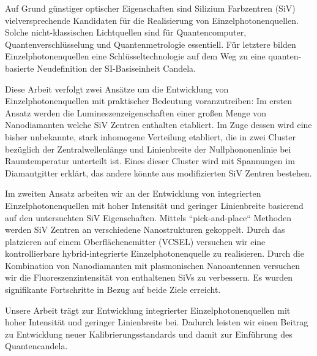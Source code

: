 	Auf Grund günstiger optischer Eigenschaften sind Silizium Farbzentren (SiV) vielversprechende Kandidaten für die Realisierung von Einzelphotonenquellen. Solche nicht-klassischen Lichtquellen sind für Quantencomputer, Quantenverschlüsselung und Quantenmetrologie essentiell. Für letztere bilden Einzelphotonenquellen eine Schlüsseltechnologie auf dem Weg zu eine quanten-basierte Neudefinition der SI-Basiseinheit Candela.

	Diese Arbeit verfolgt zwei Ansätze um die Entwicklung von Einzelphotonenquellen mit praktischer Bedeutung voranzutreiben: 
	Im ersten Ansatz werden die Lumineszenzeigenschaften einer großen Menge von Nanodiamanten welche SiV Zentren enthalten etabliert. 
	Im Zuge dessen wird eine bisher unbekannte, stark inhomogene Verteilung etabliert, die in zwei Cluster bezüglich der Zentralwellenlänge und Linienbreite der Nullphononenlinie bei Raumtemperatur unterteilt ist.
	Eines dieser Cluster wird mit Spannungen im Diamantgitter erklärt, das andere könnte aus modifizierten SiV Zentren bestehen.

	Im zweiten Ansatz arbeiten wir an der Entwicklung von integrierten Einzelphotonenquellen mit hoher Intensität und geringer Linienbreite basierend auf den untersuchten SiV Eigenschaften. Mittels “pick-and-place“ Methoden werden SiV Zentren an verschiedene Nanostrukturen gekoppelt. 
	Durch das platzieren auf einem Oberflächenemitter (VCSEL) versuchen wir eine kontrollierbare hybrid-integrierte Einzelphotonenquelle zu realisieren. 
	Durch die Kombination von Nanodiamanten mit plasmonischen Nanoantennen versuchen wir die Fluoreszenzintensität von enthaltenen SiVs zu verbessern. 
	Es wurden signifikante Fortschritte in Bezug auf beide Ziele erreicht.

	Unsere Arbeit trägt zur Entwicklung integrierter Einzelphotonenquellen mit hoher Intensität und geringer Linienbreite bei. 
	Dadurch leisten wir einen Beitrag zu Entwicklung neuer Kalibrierungsstandards und damit zur Einführung des Quantencandela. 

\vfill
